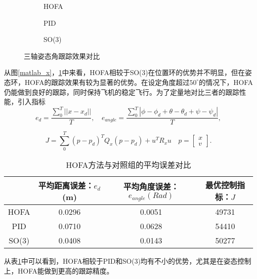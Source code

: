 \begin{figure}[!h]
  \centering
  \begin{subfigure}[t]{0.33\textwidth}
    \centering
    \caption{HOFA}
  \end{subfigure}\hfill
  \begin{subfigure}[t]{0.33\textwidth}
    \centering
    \caption{PID}
  \end{subfigure}\hfill
  \begin{subfigure}[t]{0.33\textwidth}
    \centering
    \caption{SO(3)}
  \end{subfigure}
  \caption{三轴姿态角跟踪效果对比}
  \label{matlab_angle}
\end{figure}

从图\ref{matlab_x}，\ref{matlab_angle}中来看，HOFA相较于SO(3)在位置环的优势并不明显，但在姿态环，HOFA的跟踪效果有较为显著的优势。在设定角度超过$50^\circ$的情况下，HOFA仍能做到良好的跟踪，同时保持飞机的稳定飞行。为了定量地对比三者的跟踪性能，引入指标
  $$e_d=\frac{\sum_0^{T}||x-x_d||}{T} ,\quad e_{angle}=\frac{\sum_0^{T}|\phi-\phi_d+\theta-\theta_d+\psi-\psi_d|}{T},$$

  $$J=\sum_0^{T}(p-p_d)^T Q_x(p-p_d)+u^T R_x u \quad p=\begin{bmatrix}
    x \\ v
  \end{bmatrix}.$$
  \begin{table}[!h]
    \centering
    \caption{HOFA方法与对照组的平均误差对比}
    \begin{tabular}{cccc}
        \toprule
        & 平均距离误差：$e_d$ (m)& 平均角度误差：$e_{angle}(Rad)$  & 最优控制指标：$J$ \\
        \midrule
        HOFA & 0.0296 & 0.0051 &49731 \\
        PID & 0.0710 & 0.0628 &54410 \\
        SO(3) &0.0408  &0.0143 &50277 \\
        \bottomrule
    \end{tabular}

    \label{matlab对比}
\end{table}
从表\ref{matlab对比}中可以看到，HOFA相较于PID和SO(3)均有不小的优势，尤其是在姿态控制上，HOFA能做到更高的跟踪精度。

